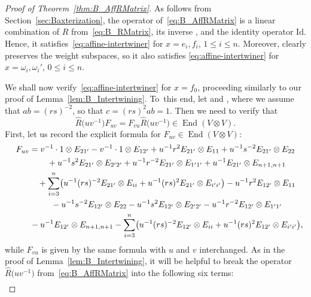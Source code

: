 \documentclass[pdftex]{sigma}
\numberwithin{equation}{section}
\DeclareMathOperator{\End}{End}
\newcommand{\Id}{\mathrm{Id}}
\begin{document}
\begin{proof}[Proof of Theorem~\ref{thm:B_AffRMatrix}]
As follows from Section~\ref{sec:Baxterization}, the operator  of~\eqref{eq:B_AffRMatrix} is a linear combination of $\hat{R}$ from~\eqref{eq:B_RMatrix}, its inverse , and the identity operator $\Id$. Hence, it satisfies~\eqref{eq:affine-intertwiner} for $x=e_i,f_i$, $1\leq i\leq n$. Moreover,  clearly preserves the weight subspaces, so it also satisfies \eqref{eq:affine-intertwiner} for $x = \omega_{i},\omega_{i}'$, $0 \le i \le n$.

We shall now verify~\eqref{eq:affine-intertwiner} for $x=f_0$, proceeding similarly to our proof of Lemma~\ref{lem:B_Intertwining}. To~this end, let  and , where we assume that $ab = (rs)^{-2}$, so that $c = (rs)^{2}ab = 1$. Then we need to verify that
\[
\hat{R}\bigl(uv^{-1}\bigr)F_{uv}= F_{vu}\hat{R}\bigl(uv^{-1}\bigr)\in \End(V \otimes V).
\]
First, let us record the explicit formula for $F_{uv}\in \End(V \otimes V)$:
\begin{gather*}
 F_{uv} = v^{-1} \cdot 1 \otimes E_{21'} - v^{-1}\cdot 1 \otimes E_{12'} + u^{-1}r^{2}E_{21'} \otimes E_{11} + u^{-1}s^{-2}E_{21'} \otimes E_{22} \\
 \hphantom{ F_{uv} =}{}
 + u^{-1}s^{2} E_{21'} \otimes E_{2'2'}+ u^{-1}r^{-2}E_{21'} \otimes E_{1'1'} + u^{-1}E_{21'} \otimes E_{n + 1,n + 1} \\
 \hphantom{ F_{uv} =}{}
+ \sum_{i = 3}^{n}\bigl(u^{-1}(rs)^{-2}E_{21'} \otimes E_{ii} + u^{-1}(rs)^{2}E_{21'} \otimes E_{i'i'}\bigr) - u^{-1}r^{2}E_{12'} \otimes E_{11} \\
 \hphantom{ F_{uv} =}{}
- u^{-1}s^{-2}E_{12'} \otimes E_{22} - u^{-1}s^{2}E_{12'} \otimes E_{2'2'} - u^{-1}r^{-2}E_{12'} \otimes E_{1'1'} \\
 \hphantom{ F_{uv} =}{}
 -u^{-1}E_{12'} \otimes E_{n+1,n+1}- \sum_{i = 3}^{n}\bigl(u^{-1}(rs)^{-2}E_{12'} \otimes E_{ii} + u^{-1}(rs)^{2}E_{12'} \otimes E_{i'i'}\bigr),
\end{gather*}
while $F_{vu}$ is given by the same formula with $u$ and $v$ interchanged. As in the proof of Lemma~\ref{lem:B_Intertwining}, it will be helpful to break the operator $\hat{R}\bigl(uv^{-1}\bigr)$ from~\eqref{eq:B_AffRMatrix} into the following six terms:
\begin{gather*}

\end{gather*}
\end{proof}
\end{document}
